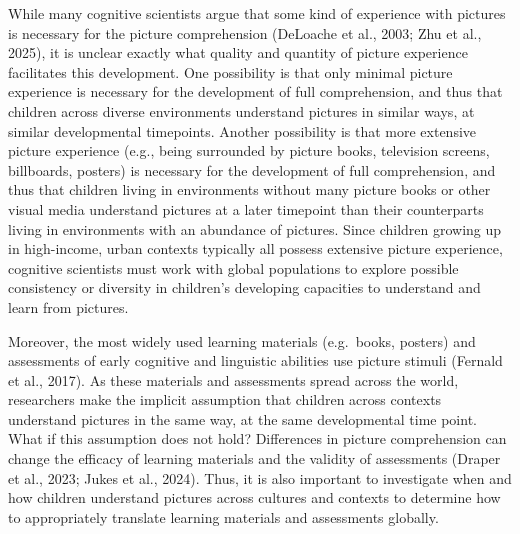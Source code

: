 \documentclass[10pt, letterpaper]{article}
\begin{document}
While many cognitive scientists argue that some kind of experience with
pictures is necessary for the picture comprehension (DeLoache et al.,
2003; Zhu et al., 2025), it is unclear exactly what quality and quantity
of picture experience facilitates this development. One possibility is
that only minimal picture experience is necessary for the development of
full comprehension, and thus that children across diverse environments
understand pictures in similar ways, at similar developmental
timepoints. Another possibility is that more extensive picture
experience (e.g., being surrounded by picture books, television screens,
billboards, posters) is necessary for the development of full
comprehension, and thus that children living in environments without
many picture books or other visual media understand pictures at a later
timepoint than their counterparts living in environments with an
abundance of pictures. Since children growing up in high-income, urban
contexts typically all possess extensive picture experience, cognitive
scientists must work with global populations to explore possible
consistency or diversity in children's developing capacities to
understand and learn from pictures.

Moreover, the most widely used learning materials (e.g.~books, posters)
and assessments of early cognitive and linguistic abilities use picture
stimuli (Fernald et al., 2017). As these materials and assessments
spread across the world, researchers make the implicit assumption that
children across contexts understand pictures in the same way, at the
same developmental time point. What if this assumption does not hold?
Differences in picture comprehension can change the efficacy of learning
materials and the validity of assessments (Draper et al., 2023; Jukes et
al., 2024). Thus, it is also important to investigate when and how
children understand pictures across cultures and contexts to determine
how to appropriately translate learning materials and assessments
globally.
\end{document}
